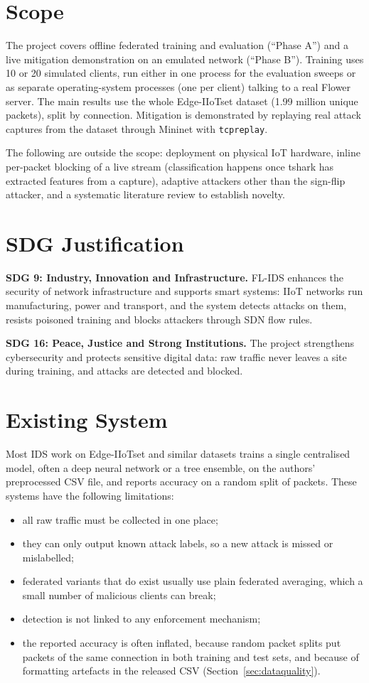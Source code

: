 \section{Scope}
The project covers offline federated training and evaluation (``Phase A'') and a live mitigation demonstration on an emulated network (``Phase B''). Training uses 10 or 20 simulated clients, run either in one process for the evaluation sweeps or as separate operating-system processes (one per client) talking to a real Flower server. The main results use the whole Edge-IIoTset dataset (1.99 million unique packets), split by connection. Mitigation is demonstrated by replaying real attack captures from the dataset through Mininet with \texttt{tcpreplay}.

The following are outside the scope: deployment on physical IoT hardware, inline per-packet blocking of a live stream (classification happens once tshark has extracted features from a capture), adaptive attackers other than the sign-flip attacker, and a systematic literature review to establish novelty.

\section{SDG Justification}
\textbf{SDG 9: Industry, Innovation and Infrastructure.} FL-IDS enhances the security of network infrastructure and supports smart systems: IIoT networks run manufacturing, power and transport, and the system detects attacks on them, resists poisoned training and blocks attackers through SDN flow rules.

\textbf{SDG 16: Peace, Justice and Strong Institutions.} The project strengthens cybersecurity and protects sensitive digital data: raw traffic never leaves a site during training, and attacks are detected and blocked.


\section{Existing System}
Most IDS work on Edge-IIoTset and similar datasets trains a single centralised model, often a deep neural network or a tree ensemble, on the authors' preprocessed CSV file, and reports accuracy on a random split of packets. These systems have the following limitations:
\begin{itemize}
  \item all raw traffic must be collected in one place;
  \item they can only output known attack labels, so a new attack is missed or mislabelled;
  \item federated variants that do exist usually use plain federated averaging, which a small number of malicious clients can break;
  \item detection is not linked to any enforcement mechanism;
  \item the reported accuracy is often inflated, because random packet splits put packets of the same connection in both training and test sets, and because of formatting artefacts in the released CSV (Section~\ref{sec:dataquality}).
\end{itemize}

